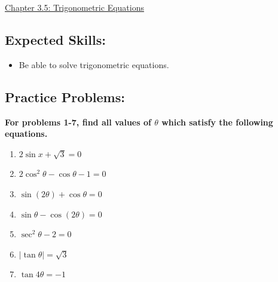 \documentclass[12pt]{article}
\newif\ifans
\begin{document}
\begin{center}
\underline{\LARGE{Chapter 3.5: Trigonometric Equations}}
\end{center}

\subsection*{Expected Skills:}

\begin{itemize}

\item Be able to solve trigonometric equations.

\end{itemize}

\subsection*{Practice Problems: }

{\bf For problems 1-7, find all values of $\theta$ which satisfy the following equations.}

\begin{enumerate}

\item $2\sin{x}+\sqrt{3}=0$

\ifans\fbox{$\theta=\frac{4\pi}{3}+2\pi k$ or $\theta=\frac{5\pi}{3}+2\pi k$, where $k$ is any integer.} \fi

\item $2\cos^2\theta-\cos\theta-1=0$

\ifans\fbox{$\theta=\frac{2\pi}{3}+2\pi k$, $\theta=\frac{4\pi}{3}+2\pi k$, or $\theta=2\pi k$, where $k$ is any integer.} \fi

\item $\sin(2\theta)+\cos{\theta}=0$

\ifans\fbox{$\theta=\frac{\pi}{2}+\pi k$, $\theta=\frac{7\pi}{6}+2\pi k$, or $\theta=\frac{11\pi}{6}+2\pi k$, where $k$ is any integer.} \fi

\item $\sin\theta-\cos{(2\theta)}=0$

\ifans\fbox{$\theta=\frac{3\pi}{2}+2\pi k$, $\theta=\frac{\pi}{6}+2\pi k$, or $\theta=\frac{5\pi}{6}+2\pi k$, where $k$ is any integer.} \fi

\item $\sec^2\theta-2=0$

\ifans\fbox{$\theta=\frac{\pi}{4}+\frac{\pi}{2}k$, where $k$ is any integer.} \fi

\item $\left|\tan{\theta}\right|=\sqrt{3}$

\ifans\fbox{$\theta=\frac{\pi}{3}+\pi k$ or $\theta=\frac{2\pi}{3}+\pi k$, where $k$ is any integer.} \fi

\item $\tan{4\theta}=-1$

\ifans\fbox{$\theta=\frac{3\pi}{16}+\frac{\pi}{4}k$, where $k$ is any integer.}\fi

\end{enumerate}
\end{document}
